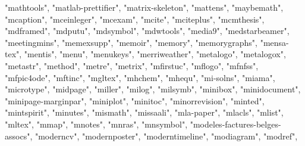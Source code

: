 \documentclass[
]{article}
\newenvironment{Shaded}{\begin{snugshade}}{\end{snugshade}}
\newcommand{\NormalTok}[1]{#1}
\newcommand{\StringTok}[1]{\textcolor[rgb]{0.31,0.60,0.02}{#1}}
\begin{document}
\begin{Shaded}
\begin{Highlighting}[]
\StringTok{"mathtools"}\NormalTok{, }\StringTok{"matlab{-}prettifier"}\NormalTok{, }\StringTok{"matrix{-}skeleton"}\NormalTok{, }\StringTok{"mattens"}\NormalTok{, }
\StringTok{"maybemath"}\NormalTok{, }\StringTok{"mcaption"}\NormalTok{, }\StringTok{"mceinleger"}\NormalTok{, }\StringTok{"mcexam"}\NormalTok{, }\StringTok{"mcite"}\NormalTok{, }\StringTok{"mciteplus"}\NormalTok{, }
\StringTok{"mcmthesis"}\NormalTok{, }\StringTok{"mdframed"}\NormalTok{, }\StringTok{"mdputu"}\NormalTok{, }\StringTok{"mdsymbol"}\NormalTok{, }\StringTok{"mdwtools"}\NormalTok{, }\StringTok{"media9"}\NormalTok{, }
\StringTok{"medstarbeamer"}\NormalTok{, }\StringTok{"meetingmins"}\NormalTok{, }\StringTok{"memexsupp"}\NormalTok{, }\StringTok{"memoir"}\NormalTok{, }\StringTok{"memory"}\NormalTok{, }
\StringTok{"memorygraphs"}\NormalTok{, }\StringTok{"mensa{-}tex"}\NormalTok{, }\StringTok{"mentis"}\NormalTok{, }\StringTok{"menu"}\NormalTok{, }\StringTok{"menukeys"}\NormalTok{, }\StringTok{"merriweather"}\NormalTok{, }
\StringTok{"metalogo"}\NormalTok{, }\StringTok{"metalogox"}\NormalTok{, }\StringTok{"metastr"}\NormalTok{, }\StringTok{"method"}\NormalTok{, }\StringTok{"metre"}\NormalTok{, }\StringTok{"metrix"}\NormalTok{, }
\StringTok{"mfirstuc"}\NormalTok{, }\StringTok{"mflogo"}\NormalTok{, }\StringTok{"mfnfss"}\NormalTok{, }\StringTok{"mfpic4ode"}\NormalTok{, }\StringTok{"mftinc"}\NormalTok{, }\StringTok{"mgltex"}\NormalTok{, }
\StringTok{"mhchem"}\NormalTok{, }\StringTok{"mhequ"}\NormalTok{, }\StringTok{"mi{-}solns"}\NormalTok{, }\StringTok{"miama"}\NormalTok{, }\StringTok{"microtype"}\NormalTok{, }\StringTok{"midpage"}\NormalTok{, }
\StringTok{"miller"}\NormalTok{, }\StringTok{"milog"}\NormalTok{, }\StringTok{"milsymb"}\NormalTok{, }\StringTok{"minibox"}\NormalTok{, }\StringTok{"minidocument"}\NormalTok{, }\StringTok{"minipage{-}marginpar"}\NormalTok{, }
\StringTok{"miniplot"}\NormalTok{, }\StringTok{"minitoc"}\NormalTok{, }\StringTok{"minorrevision"}\NormalTok{, }\StringTok{"minted"}\NormalTok{, }\StringTok{"mintspirit"}\NormalTok{, }
\StringTok{"minutes"}\NormalTok{, }\StringTok{"mismath"}\NormalTok{, }\StringTok{"missaali"}\NormalTok{, }\StringTok{"mla{-}paper"}\NormalTok{, }\StringTok{"mlacls"}\NormalTok{, }\StringTok{"mlist"}\NormalTok{, }
\StringTok{"mltex"}\NormalTok{, }\StringTok{"mmap"}\NormalTok{, }\StringTok{"mnotes"}\NormalTok{, }\StringTok{"mnras"}\NormalTok{, }\StringTok{"mnsymbol"}\NormalTok{, }\StringTok{"modeles{-}factures{-}belges{-}assocs"}\NormalTok{, }
\StringTok{"moderncv"}\NormalTok{, }\StringTok{"modernposter"}\NormalTok{, }\StringTok{"moderntimeline"}\NormalTok{, }\StringTok{"modiagram"}\NormalTok{, }\StringTok{"modref"}\NormalTok{, }

\end{Highlighting}
\end{Shaded}
\end{document}
